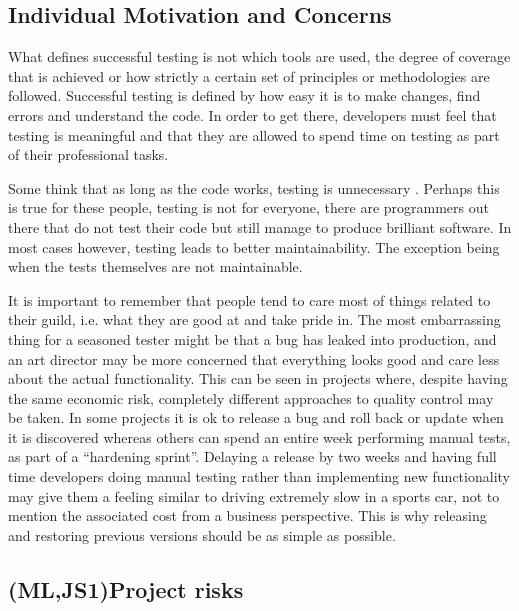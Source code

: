 \documentclass[11pt]{article}
\begin{document}
\subsection{Individual Motivation and Concerns}
\label{subsec:motivationconcerns}

What defines successful testing is not which tools are used, the degree of coverage that is achieved or how strictly a certain set of principles or methodologies are followed. Successful testing is defined by how easy it is to make changes, find errors and understand the code. In order to get there, developers must feel that testing is meaningful and that they are allowed to spend time on testing as part of their professional tasks.

Some think that as long as the code works, testing is unnecessary \cite[question~13]{Ahnve}. Perhaps this is true for these people, testing is not for everyone, there are programmers out there that do not test their code but still manage to produce brilliant software. In most cases however, testing leads to better maintainability. The exception being when the tests themselves are not maintainable. \cite[question~33]{Ahnve}\cite[question~28]{Edelstam}

It is important to remember that people tend to care most of things related to their guild, i.e. what they are good at and take pride in. The most embarrassing thing for a seasoned tester might be that a bug has leaked into production, and an art director may be more concerned that everything looks good and care less about the actual functionality. This can be seen in projects where, despite having the same economic risk, completely different approaches to quality control may be taken. In some projects it is ok to release a bug and roll back or update when it is discovered whereas others can spend an entire week performing manual tests, as part of a ``hardening sprint''. Delaying a release by two weeks and having full time developers doing manual testing rather than implementing new functionality may give them a feeling similar to driving extremely slow in a sports car, not to mention the associated cost from a business perspective. This is why releasing and restoring previous versions should be as simple as possible. \cite[question~38]{Ahnve}

\subsection{(ML,JS1)Project risks}
\label{subsec:projectrisks}
\end{document}
